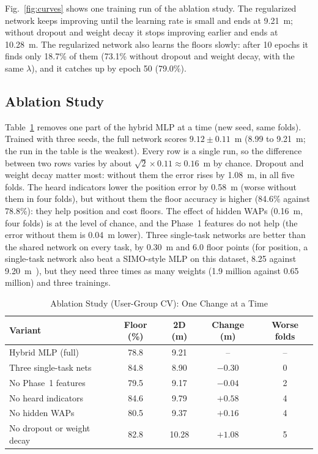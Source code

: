 Fig.~\ref{fig:curves} shows one training run of the ablation study. The
regularized network keeps improving until the learning rate is small and ends
at 9.21~m; without dropout and weight decay it stops improving earlier and ends
at 10.28~m. The regularized network also learns the floors slowly: after 10
epochs it finds only 18.7\% of them (73.1\% without dropout and weight decay, with
the same $\lambda$), and it catches up by epoch 50 (79.0\%).

\subsection{Ablation Study}\label{sec:res-ablation}
Table~\ref{tab:ablation} removes one part of the hybrid MLP at a time (new seed,
same folds). Trained with three seeds, the full network scores
$9.12\pm0.11$~m (8.99 to 9.21~m; the run in the table is the weakest). Every
row is a single run, so the difference between two rows varies by about
$\sqrt{2}\times0.11\approx0.16$~m by chance. Dropout and weight decay matter
most: without them the error rises by 1.08~m, in all five folds. The heard
indicators lower the position error by 0.58~m (worse without them in four
folds), but without them the floor accuracy is higher (84.6\% against 78.8\%):
they help position and cost floors. The effect of hidden WAPs (0.16~m, four
folds) is at the level of chance, and the Phase~1 features do not help (the
error without them is 0.04~m lower). Three single-task networks are better than
the shared network on every task, by 0.30~m and 6.0 floor points (for position,
a single-task network also beat a SIMO-style MLP on this dataset, 8.25 against
9.20~m~\cite{laska2022multitask}), but they need three times as many weights
(1.9 million against 0.65 million) and three trainings.

\begin{table}[t]
  \caption{Ablation Study (User-Group CV): One Change at a Time}
  \label{tab:ablation}
  \centering
  \footnotesize
  \setlength{\tabcolsep}{3pt}
  \begin{tabular}{@{}lcccc@{}}
    \toprule
    Variant & Floor (\%) & 2D (m) & Change (m) & Worse folds \\
    \midrule
    Hybrid MLP (full) & 78.8 & 9.21 & -- & -- \\
    Three single-task nets & 84.8 & 8.90 & $-0.30$ & 0 \\
    No Phase~1 features & 79.5 & 9.17 & $-0.04$ & 2 \\
    No heard indicators & 84.6 & 9.79 & $+0.58$ & 4 \\
    No hidden WAPs & 80.5 & 9.37 & $+0.16$ & 4 \\
    No dropout or weight decay & 82.8 & 10.28 & $+1.08$ & 5 \\
    \bottomrule
  \end{tabular}
\end{table}

